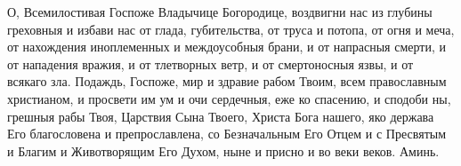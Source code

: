 \begin{mymulticols}
О, Всемилостивая Госпоже Владычице Богородице, воздвигни нас из глубины греховныя и избави нас от глада, губительства, от труса и потопа, от огня и меча, от нахождения иноплеменных и междоусобныя брани, и от напрасныя смерти, и от нападения вражия, и от тлетворных ветр, и от смертоносныя язвы, и от всякаго зла. Подаждь, Госпоже, мир и здравие рабом Твоим, всем православным христианом, и просвети им ум и очи сердечныя, еже ко спасению, и сподоби ны, грешныя рабы Твоя, Царствия Сына Твоего, Христа Бога нашего, яко держава Его благословена и препрославлена, со Безначальным Его Отцем и с Пресвятым и Благим и Животворящим Его Духом, ныне и присно и во веки веков. Аминь.

\end{mymulticols}

\mychapterending


